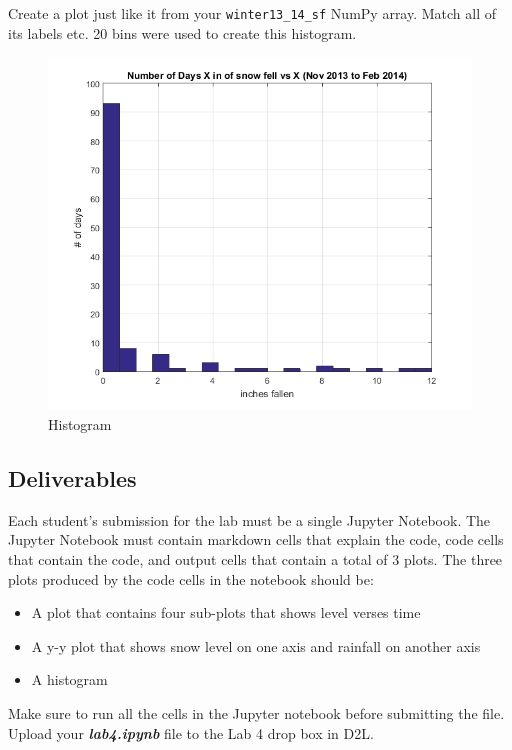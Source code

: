 \documentclass[11pt]{article}
\makeatletter
\def\maxwidth{\ifdim\Gin@nat@width>\linewidth\linewidth
    \else\Gin@nat@width\fi}
\let\Oldincludegraphics\includegraphics
\renewcommand{\includegraphics}[1]{\Oldincludegraphics[width=.8\maxwidth]{#1}}
\makeatother
\begin{document}
Create a plot just like it from your \texttt{winter13\_14\_sf} NumPy
array. Match all of its labels etc. 20 bins were used to create this
histogram.

\begin{figure}
\centering
\includegraphics{images/fig3.png}
\caption{Histogram}
\end{figure}

    \hypertarget{deliverables}{%
\subsection{Deliverables}\label{deliverables}}

Each student's submission for the lab must be a single Jupyter Notebook.
The Jupyter Notebook must contain markdown cells that explain the code,
code cells that contain the code, and output cells that contain a total
of 3 plots. The three plots produced by the code cells in the notebook
should be:

\begin{itemize}
\item
  A plot that contains four sub-plots that shows level verses time
\item
  A y-y plot that shows snow level on one axis and rainfall on another
  axis
\item
  A histogram
\end{itemize}

Make sure to run all the cells in the Jupyter notebook before submitting
the file. Upload your \textbf{\emph{lab4.ipynb}} file to the Lab 4 drop
box in D2L.


    
    
    
    
\end{document}
